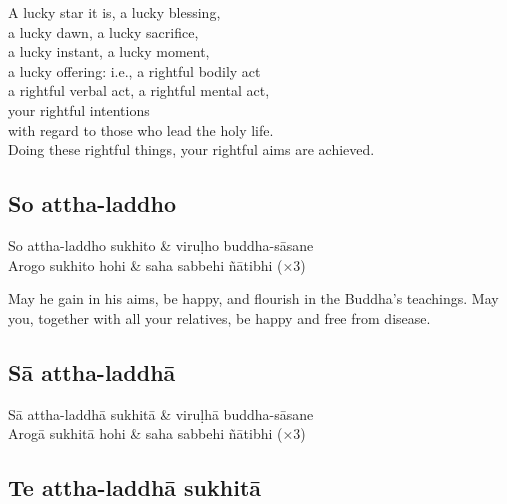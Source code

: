 A lucky star it is, a lucky blessing,\\
a lucky dawn, a lucky sacrifice,\\
a lucky instant, a lucky moment,\\
a lucky offering: i.e., a rightful bodily act\\
a rightful verbal act, a rightful mental act,\\
your rightful intentions\\
with regard to those who lead the holy life.\\
Doing these rightful things,
your rightful aims are achieved.

\subsection{So attha-laddho}


\begin{twochants}
So attha-laddho sukhito & viruḷho buddha-sāsane\\
Arogo sukhito hohi & saha sabbehi ñātibhi (×3)\\
\end{twochants}

\begin{english}
  May he gain in his aims, be happy, and flourish in the Buddha's teachings. May
  you, together with all your relatives, be happy and free from disease.
\end{english}

\subsection{Sā attha-laddhā}


\begin{twochants}
Sā attha-laddhā sukhitā & viruḷhā buddha-sāsane\\
Arogā sukhitā hohi & saha sabbehi ñātibhi (×3)\\
\end{twochants}

\subsection{Te attha-laddhā sukhitā}
\label{te-attha-laddha}


